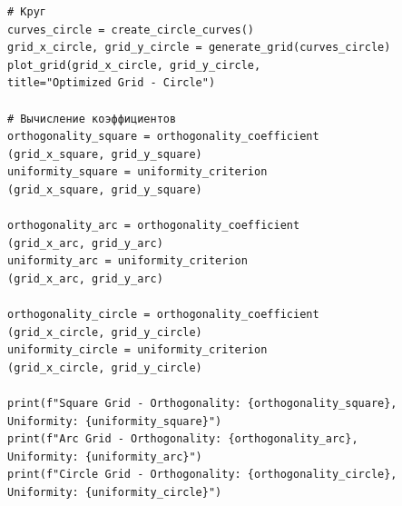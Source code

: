 \documentclass[a4paper,14pt,russian]{extreport}
\renewcommand{\_}{\kern-1.5pt\textunderscore\kern-1.5pt}
\begin{document}
\begin{verbatim}
# Круг
curves_circle = create_circle_curves()
grid_x_circle, grid_y_circle = generate_grid(curves_circle)
plot_grid(grid_x_circle, grid_y_circle,
title="Optimized Grid - Circle")

# Вычисление коэффициентов
orthogonality_square = orthogonality_coefficient
(grid_x_square, grid_y_square)
uniformity_square = uniformity_criterion
(grid_x_square, grid_y_square)

orthogonality_arc = orthogonality_coefficient
(grid_x_arc, grid_y_arc)
uniformity_arc = uniformity_criterion
(grid_x_arc, grid_y_arc)

orthogonality_circle = orthogonality_coefficient
(grid_x_circle, grid_y_circle)
uniformity_circle = uniformity_criterion
(grid_x_circle, grid_y_circle)

print(f"Square Grid - Orthogonality: {orthogonality_square}, 
Uniformity: {uniformity_square}")
print(f"Arc Grid - Orthogonality: {orthogonality_arc}, 
Uniformity: {uniformity_arc}")
print(f"Circle Grid - Orthogonality: {orthogonality_circle},
Uniformity: {uniformity_circle}")
\end{verbatim}
\end{document}
